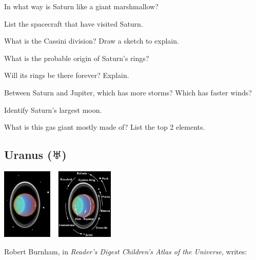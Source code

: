 \documentclass{article}
\numberwithin{equation}{section}
\numberwithin{figure}{section}
\begin{document}
\begin{exercise}
    In what way is Saturn like a giant marshmallow?
\end{exercise}

\begin{exercise}
    List the spacecraft that have visited Saturn.
\end{exercise}

\begin{exercise}
    What is the Cassini division? Draw a sketch to explain.
\end{exercise}

\begin{exercise}
    What is the probable origin of Saturn's rings?
\end{exercise}

\begin{exercise}
    Will its rings be there forever? Explain.
\end{exercise}

\begin{exercise}
    Between Saturn and Jupiter, which has more storms? Which has faster winds?
\end{exercise}

\begin{exercise}
    Identify Saturn's largest moon.
\end{exercise}

\begin{exercise}
    What is this gas giant mostly made of? List the top 2 elements.
\end{exercise}

\clearpage

\subsection{Uranus ($\Uranus$)} \label{ejwEWF}

\begin{center}
    \includegraphics[width=5.5cm]{Figures/Figure11.5.jpeg}
\end{center}

Robert Burnham, in \textit{Reader's Digest Children's Atlas of the Universe}, writes:
\end{document}
